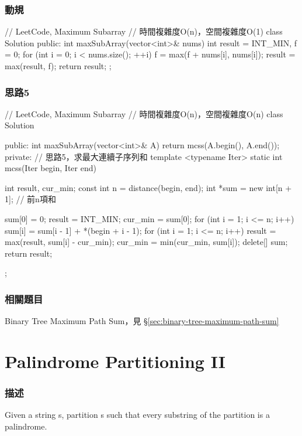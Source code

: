 \subsubsection{動規}
\begin{Code}
// LeetCode, Maximum Subarray
// 時間複雜度O(n)，空間複雜度O(1)
class Solution {
public:
    int maxSubArray(vector<int>& nums) {
        int result = INT_MIN, f = 0;
        for (int i = 0; i < nums.size(); ++i) {
            f = max(f + nums[i], nums[i]);
            result = max(result, f);
        }
        return result;
    }
};
\end{Code}


\subsubsection{思路5}
\begin{Code}
// LeetCode, Maximum Subarray
// 時間複雜度O(n)，空間複雜度O(n)
class Solution {
public:
    int maxSubArray(vector<int>& A) {
        return mcss(A.begin(), A.end());
    }
private:
    // 思路5，求最大連續子序列和
    template <typename Iter>
    static int mcss(Iter begin, Iter end) {
        int result, cur_min;
        const int n = distance(begin, end);
        int *sum = new int[n + 1];  // 前n項和

        sum[0] = 0;
        result = INT_MIN;
        cur_min = sum[0];
        for (int i = 1; i <= n; i++) {
            sum[i] = sum[i - 1] + *(begin  + i - 1);
        }
        for (int i = 1; i <= n; i++) {
            result = max(result, sum[i] - cur_min);
            cur_min = min(cur_min, sum[i]);
        }
        delete[] sum;
        return result;
    }
};
\end{Code}


\subsubsection{相關題目}
\begindot
\item Binary Tree Maximum Path Sum，見 \S \ref{sec:binary-tree-maximum-path-sum}
\myenddot


\section{Palindrome Partitioning II} %
\label{sec:palindrome-partitioning-ii}


\subsubsection{描述}
Given a string s, partition s such that every substring of the partition is a palindrome.

